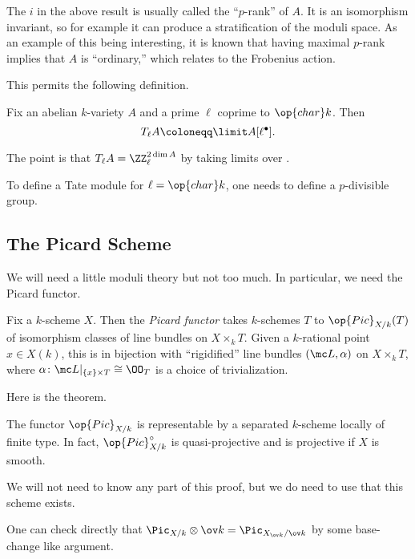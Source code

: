 \documentclass[../notes.tex]{subfiles}
\begin{document}
\begin{remark}
	The $i$ in the above result is usually called the ``$p$-rank'' of $A$. It is an isomorphism invariant, so for example it can produce a stratification of the moduli space. As an example of this being interesting, it is known that having maximal $p$-rank implies that $A$ is ``ordinary,'' which relates to the Frobenius action.
\end{remark}
This permits the following definition.
\begin{definition}
	Fix an abelian $k$-variety $A$ and a prime $\ell$ coprime to $\op{char}k$. Then
	\[T_\ell A\coloneqq\limit A[\ell^\bullet].\]
\end{definition}
The point is that $T_\ell A=\ZZ_\ell^{2\dim A}$ by taking limits over .
\begin{remark}
	To define a Tate module for $\ell=\op{char}k$, one needs to define a $p$-divisible group.
\end{remark}

\subsection{The Picard Scheme}
We will need a little moduli theory but not too much. In particular, we need the Picard functor.
\begin{definition}[Picard]
	Fix a $k$-scheme $X$. Then the \textit{Picard functor} takes $k$-schemes $T$ to $\op{Pic}_{X/k}(T)$ of isomorphism classes of line bundles on $X\times_kT$. Given a $k$-rational point $x\in X(k)$, this is in bijection with ``rigidified'' line bundles $(\mc L,\alpha)$ on $X\times_kT$, where $\alpha\colon\mc L|_{\{x\}\times T}\cong\OO_T$ is a choice of trivialization.
\end{definition}
Here is the theorem.
\begin{theorem}[Grothendieck]
	The functor $\op{Pic}_{X/k}$ is representable by a separated $k$-scheme locally of finite type. In fact, $\op{Pic}^\circ_{X/k}$ is quasi-projective and is projective if $X$ is smooth.
\end{theorem}
We will not need to know any part of this proof, but we do need to use that this scheme exists.
\begin{remark}
	One can check directly that $\Pic_{X/k}\otimes\ov k=\Pic_{X_{\ov k}/\ov k}$ by some base-change like argument.
\end{remark}
\end{document}
